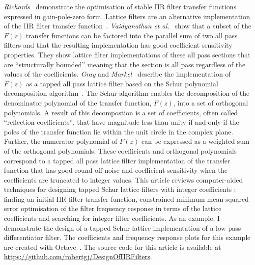 \documentclass[a4paper,twoside,10pt,english]{article}
\begin{document}
\emph{Richards}~\cite{Richards_DeczkyRecursiveDecimator} demonstrate the
optimisation of stable IIR filter transfer functions expressed in gain-pole-zero
form.
Lattice filters are an alternative implementation of the IIR filter
transfer function~\cite{VaidyanathanMitra_RobustFilterStructures}.
\emph{Vaidyanathan et
  al.}~\cite{VaidyanathanMitraNuevo_LowSensitivityIIRDigitalFilters,
  RegaliaMitraVaidyanathan_DigitalAllPassFilterVersatileSignalProcessing} show
that a subset of the $F\left(z\right)$ transfer functions can be factored into
the parallel sum of two all pass filters and that the resulting implementation
has good coefficient sensitivity properties. They show lattice filter
implementations of these all pass sections that are ``structurally bounded''
meaning that the section is all pass regardless of the values of the
coefficients. \emph{Gray} and
\emph{Markel}~\cite{GrayMarkel_DigitalLatticeAndLadderFilterSynthesis,
  MarkelGray_AutocorrelationSpeechAnalysis} describe the implementation of
$F\left(z\right)$ as a tapped all pass lattice filter based on the Schur
polynomial decomposition algorithm~\cite{SchurMethodsInOperatorTheory_Kailath,
  SchurMethodsInOperatorTheory_Schur_I}.
The Schur algorithm enables the decomposition of the denominator polynomial of
the transfer function, $F\left(z\right)$, into a set of orthogonal
polynomials. A result of this decompostion is a set of coefficients, often
called ``reflection coefficients'', that have magnitude less than unity
if-and-only-if the poles of the transfer function lie within the unit circle in
the complex plane. Further, the numerator polynomial of $F\left(z\right)$ can be
expressed as a weighted sum of the orthogonal polynomials. These coefficients and
orthogonal polynomials correspond to a tapped all pass lattice filter
implementation of the transfer function that has good round-off noise and
coefficient sensitivity when the coefficients are truncated to integer values.
This article reviews computer-aided techniques for designing tapped Schur
lattice filters with integer coefficients : finding an initial IIR filter
transfer function, constrained minimum-mean-squared-error optimisation of the
filter frequency response in terms of the lattice coefficients and searching for
integer filter coefficients. As an example, I demonstrate the design of a tapped
Schur lattice implementation of a low pass differentiator filter. The
coefficients and frequency response plots for this example are created with
Octave~\cite{Eaton_Octave,Octave_OptimPackage,Octave_SignalPackage}.
The source code for this article is available at
\url{https://github.com/robertgj/DesignOfIIRFilters}.
\end{document}
